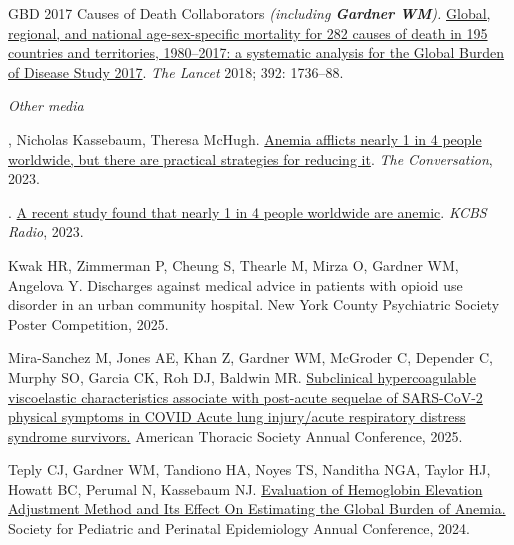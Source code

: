 \documentclass[11pt,article,oneside]{memoir}
\begin{document}
\ind GBD 2017 Causes of Death Collaborators \emph{(including \textbf{Gardner WM}).} \href{https://doi.org/10.1016/S0140-6736(18)32203-7}{Global, regional, and national age-sex-specific
mortality for 282 causes of death in 195 countries and territories, 1980--2017: a systematic analysis for the
Global Burden of Disease Study 2017}. \emph{The Lancet} 2018; 392: 1736--88.

\bigskip 
\noindent\emph{Other media \vspace{0.05in}}

, Nicholas Kassebaum, Theresa McHugh. \href{https://theconversation.com/anemia-afflicts-nearly-1-in-4-people-worldwide-but-there-are-practical-strategies-for-reducing-it-212177}{ 
Anemia afflicts nearly 1 in 4 people worldwide, but there are practical strategies for reducing it}. \emph{The Conversation}, 2023.

. \href{https://omny.fm/shows/kcbsam-on-demand/a-recent-study-found-that-nearly-1-in-four-people}{
	A recent study found that nearly 1 in 4 people worldwide are anemic}. \emph{KCBS Radio}, 2023.

\bigskip

\medskip

\ind Kwak HR, Zimmerman P, Cheung S, Thearle M, Mirza O, {\minbold Gardner WM}, Angelova Y. Discharges against medical advice in patients with opioid use disorder in an urban community hospital. 
New York County Psychiatric Society Poster Competition, 2025.

\ind Mira-Sanchez M, Jones AE, Khan Z, {\minbold Gardner WM}, McGroder C, Depender C, Murphy SO, Garcia CK, Roh DJ, Baldwin MR. \href{https://www.atsjournals.org/doi/abs/10.1164/ajrccm.2025.211.Abstracts.A3694}{Subclinical 
hypercoagulable viscoelastic characteristics associate with post-acute sequelae of SARS-CoV-2 physical symptoms in COVID Acute lung injury/acute respiratory distress syndrome survivors.} American Thoracic Society Annual Conference, 2025. 

\ind Teply CJ, {\minbold Gardner WM}, Tandiono HA, Noyes TS, Nanditha NGA, Taylor HJ, Howatt BC, Perumal N, Kassebaum NJ. \href{https://sper.org/wp-content/uploads/2024/06/2024-Abstract-Book-FINAL.pdf}{Evaluation of Hemoglobin Elevation Adjustment Method and 
Its Effect On Estimating the Global Burden of Anemia.} Society for Pediatric and Perinatal Epidemiology Annual Conference, 2024. 
\end{document}
